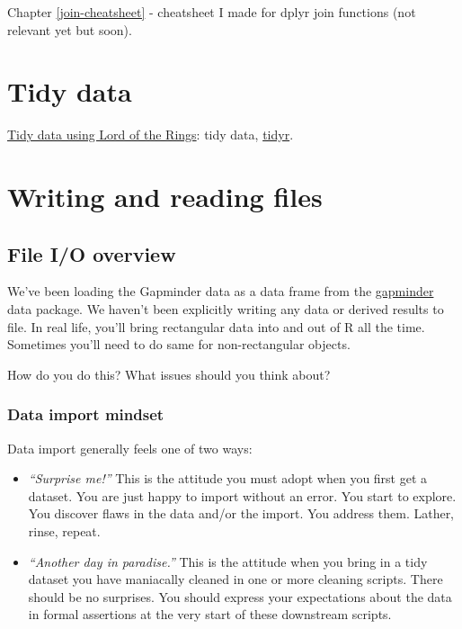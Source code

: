 \documentclass[
]{book}
\providecommand{\tightlist}{%
  \setlength{\itemsep}{0pt}\setlength{\parskip}{0pt}}
\begin{document}
Chapter \ref{join-cheatsheet} - cheatsheet I made for dplyr join functions (not relevant yet but soon).

\hypertarget{tidy-data}{%
\chapter{Tidy data}\label{tidy-data}}

\href{https://github.com/jennybc/lotr-tidy\#readme}{Tidy data using Lord of the Rings}: tidy data, \href{https://tidyr.tidyverse.org}{tidyr}.

\hypertarget{import-export}{%
\chapter{Writing and reading files}\label{import-export}}

\hypertarget{file-io-overview}{%
\section{File I/O overview}\label{file-io-overview}}

We've been loading the Gapminder data as a data frame from the \href{https://github.com/jennybc/gapminder}{gapminder} data package. We haven't been explicitly writing any data or derived results to file. In real life, you'll bring rectangular data into and out of R all the time. Sometimes you'll need to do same for non-rectangular objects.

How do you do this? What issues should you think about?

\hypertarget{data-import-mindset}{%
\subsection{Data import mindset}\label{data-import-mindset}}

Data import generally feels one of two ways:

\begin{itemize}
\tightlist
\item
  \emph{``Surprise me!''} This is the attitude you must adopt when you first get a dataset. You are just happy to import without an error. You start to explore. You discover flaws in the data and/or the import. You address them. Lather, rinse, repeat.
\item
  \emph{``Another day in paradise.''} This is the attitude when you bring in a tidy dataset you have maniacally cleaned in one or more cleaning scripts. There should be no surprises. You should express your expectations about the data in formal assertions at the very start of these downstream scripts.
\end{itemize}
\end{document}
